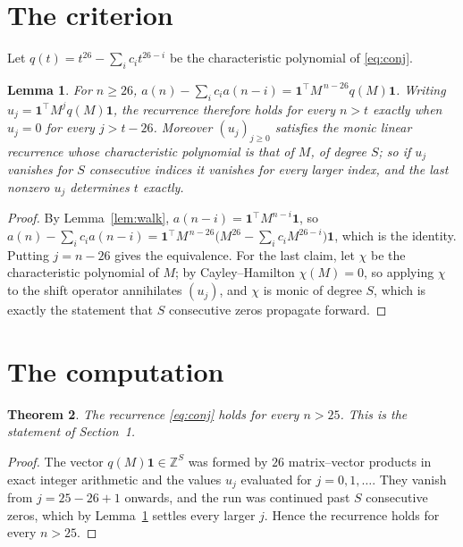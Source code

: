 \documentclass[11pt,a4paper]{article}
\theoremstyle{plain}
\newtheorem{theorem}{Theorem}
\newtheorem{lemma}[theorem]{Lemma}
\theoremstyle{definition}
\begin{document}
\section{The criterion}

Let $q(t)=t^{26}-\sum_i c_i t^{26-i}$ be the characteristic polynomial of
\eqref{eq:conj}.

\begin{lemma}\label{lem:crit}
For $n\ge26$,
$a(n)-\sum_i c_i a(n-i)=\mathbf{1}^{\!\top}M^{\,n-26}q(M)\mathbf{1}$. Writing
$u_j=\mathbf{1}^{\!\top}M^{j}q(M)\mathbf{1}$, the recurrence therefore holds for every
$n>t$ exactly when $u_j=0$ for every $j>t-26$. Moreover $(u_j)_{j\ge0}$ satisfies the
monic linear recurrence whose characteristic polynomial is that of $M$, of degree $S$; so
if $u_j$ vanishes for $S$ consecutive indices it vanishes for every larger index, and the
last nonzero $u_j$ determines $t$ exactly.
\end{lemma}

\begin{proof}
By Lemma~\ref{lem:walk}, $a(n-i)=\mathbf{1}^{\!\top}M^{n-i}\mathbf{1}$, so
$a(n)-\sum_i c_i a(n-i)
=\mathbf{1}^{\!\top}M^{\,n-26}\bigl(M^{26}-\sum_i c_i M^{26-i}\bigr)
\mathbf{1}$, which is the identity. Putting $j=n-26$ gives the equivalence. For the
last claim, let $\chi$ be the characteristic polynomial of $M$; by Cayley--Hamilton
$\chi(M)=0$, so applying $\chi$ to the shift operator annihilates $(u_j)$, and $\chi$ is
monic of degree $S$, which is exactly the statement that $S$ consecutive zeros propagate
forward.
\end{proof}

\section{The computation}

\begin{theorem}
The recurrence \eqref{eq:conj} holds for every $n>25$. This is the statement of
Section~1.
\end{theorem}

\begin{proof}
The vector $q(M)\mathbf{1}\in\mathbb{Z}^{S}$ was formed by $26$ matrix--vector
products in exact integer arithmetic and the values $u_j$ evaluated for
$j=0,1,\dots$. They vanish from $j=25-26+1$ onwards, and the run was continued past
$S$ consecutive zeros, which by Lemma~\ref{lem:crit} settles every larger $j$. Hence the
recurrence holds for every $n>25$.
\end{proof}
\end{document}
